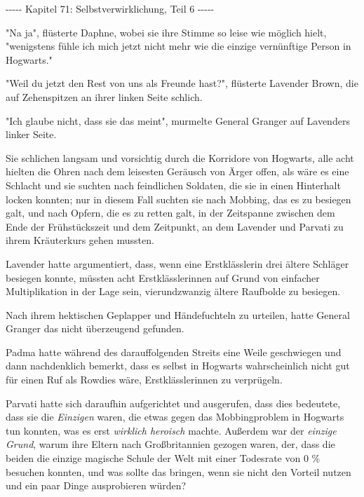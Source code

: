 

\hypertarget{selbstverwirklichung-teil-6}{%

-\/-\/-\/-\/- Kapitel 71: Selbstverwirklichung, Teil 6 -\/-\/-\/-\/-

"Na ja", flüsterte Daphne, wobei sie ihre Stimme so leise wie möglich hielt, "wenigstens fühle ich mich jetzt nicht mehr wie die einzige vernünftige Person in Hogwarts."

"Weil du jetzt den Rest von uns als Freunde hast?", flüsterte Lavender Brown, die auf Zehenspitzen an ihrer linken Seite schlich.

"Ich glaube nicht, dass sie das meint", murmelte General Granger auf Lavenders linker Seite.

Sie schlichen langsam und vorsichtig durch die Korridore von Hogwarts, alle acht hielten die Ohren nach dem leisesten Geräusch von Ärger offen, als wäre es eine Schlacht und sie suchten nach feindlichen Soldaten, die sie in einen Hinterhalt locken konnten; nur in diesem Fall suchten sie nach Mobbing, das es zu besiegen galt, und nach Opfern, die es zu retten galt, in der Zeitspanne zwischen dem Ende der Frühstückszeit und dem Zeitpunkt, an dem Lavender und Parvati zu ihrem Kräuterkurs gehen mussten.

Lavender hatte argumentiert, dass, wenn eine Erstklässlerin drei ältere Schläger besiegen konnte, müssten acht Erstklässlerinnen auf Grund von einfacher Multiplikation in der Lage sein, vierundzwanzig ältere Raufbolde zu besiegen.

Nach ihrem hektischen Geplapper und Händefuchteln zu urteilen, hatte General Granger das nicht überzeugend gefunden.

Padma hatte während des darauffolgenden Streits eine Weile geschwiegen und dann nachdenklich bemerkt, dass es selbst in Hogwarts wahrscheinlich nicht gut für einen Ruf als Rowdies wäre, Erstklässlerinnen zu verprügeln.

Parvati hatte sich daraufhin aufgerichtet und ausgerufen, dass dies bedeutete, dass sie die \emph{Einzigen} waren, die etwas gegen das Mobbingproblem in Hogwarts tun konnten, was es erst \emph{wirklich heroisch} machte. Außerdem war der \emph{einzige} \emph{Grund}, warum ihre Eltern nach Großbritannien gezogen waren, der, dass die beiden die einzige magische Schule der Welt mit einer Todesrate von 0 \% besuchen konnten, und was sollte das bringen, wenn sie nicht den Vorteil nutzen und ein paar Dinge ausprobieren würden?

}
